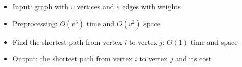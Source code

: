 \begin{itemize}
	\item Input: graph with $v$ vertices and $e$ edges with weights
	\item Preprocessing: $O(v^3)$ time and $O(v^2)$ space
	\item Find the shortest path from vertex $i$ to vertex $j$: $O(1)$ time and space
	\item Output: the shortest path from vertex $i$ to vertex $j$ and its cost
\end{itemize}